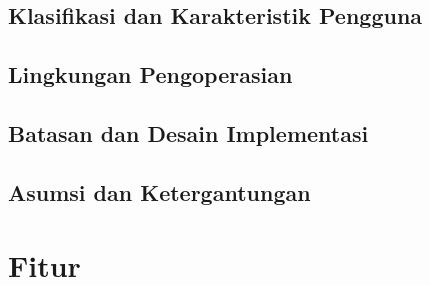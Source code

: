 \documentclass[12pt, a4paper, oneside]{book}
\begin{document}
	\section{Klasifikasi dan Karakteristik Pengguna}
		
	\section{Lingkungan Pengoperasian}
		
	\section{Batasan dan Desain Implementasi}
	\section{Asumsi dan Ketergantungan}
	\pagebreak
	\chapter{Fitur}	
	
\end{document}
